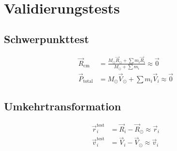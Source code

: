 \section{Validierungstests}

\subsection*{Schwerpunkttest}
\begin{align}
\vec{R}_{\text{cm}} &= \frac{M_\odot \vec{R}_\odot + \sum m_i \vec{R}_i}{M_\odot + \sum m_i} \approx \vec{0} \\
\vec{P}_{\text{total}} &= M_\odot \vec{V}_\odot + \sum m_i \vec{V}_i \approx \vec{0}
\end{align}

\subsection*{Umkehrtransformation}
\begin{align}
\vec{r}_i^{\text{test}} &= \vec{R}_i - \vec{R}_\odot \approx \vec{r}_i \\
\vec{v}_i^{\text{test}} &= \vec{V}_i - \vec{V}_\odot \approx \vec{v}_i
\end{align}